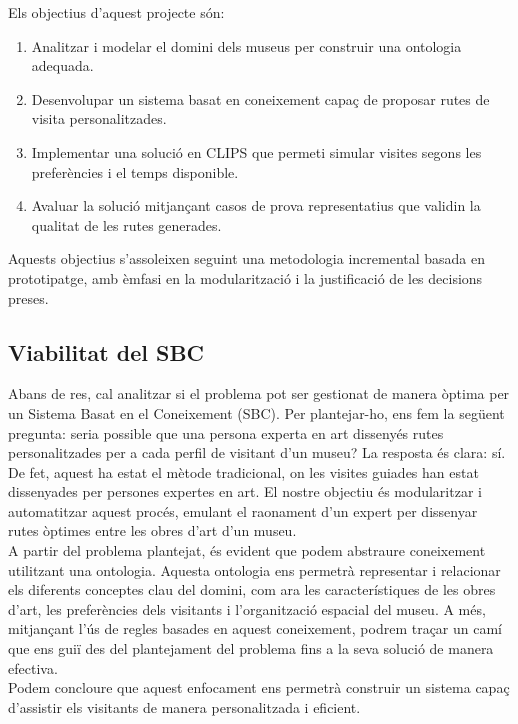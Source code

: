 \documentclass[a4paper]{article}
\begin{document}
	Els objectius d’aquest projecte són:
	\begin{enumerate}
		\item Analitzar i modelar el domini dels museus per construir una ontologia adequada.
		\item Desenvolupar un sistema basat en coneixement capaç de proposar rutes de visita personalitzades.
		\item Implementar una solució en CLIPS que permeti simular visites segons les preferències i el temps disponible.
		\item Avaluar la solució mitjançant casos de prova representatius que validin la qualitat de les rutes generades.
	\end{enumerate}
	Aquests objectius s’assoleixen seguint una metodologia incremental basada en prototipatge, amb èmfasi en la modularització i la justificació de les decisions preses.
	
	\subsection{Viabilitat del SBC}
	
	Abans de res, cal analitzar si el problema pot ser gestionat de manera òptima per un Sistema Basat en el Coneixement (SBC). Per plantejar-ho, ens fem la següent pregunta: seria possible que una persona experta en art dissenyés rutes personalitzades per a cada perfil de visitant d’un museu? La resposta és clara: sí. De fet, aquest ha estat el mètode tradicional, on les visites guiades han estat dissenyades per persones expertes en art. El nostre objectiu és modularitzar i automatitzar aquest procés, emulant el raonament d’un expert per dissenyar rutes òptimes entre les obres d’art d’un museu. \\
	
	A partir del problema plantejat, és evident que podem abstraure coneixement utilitzant una ontologia. Aquesta ontologia ens permetrà representar i relacionar els diferents conceptes clau del domini, com ara les característiques de les obres d’art, les preferències dels visitants i l’organització espacial del museu. A més, mitjançant l’ús de regles basades en aquest coneixement, podrem traçar un camí que ens guiï des del plantejament del problema fins a la seva solució de manera efectiva. \\
	
	Podem concloure que aquest enfocament ens permetrà construir un sistema capaç d’assistir els visitants de manera personalitzada i eficient.
	
\end{document}
